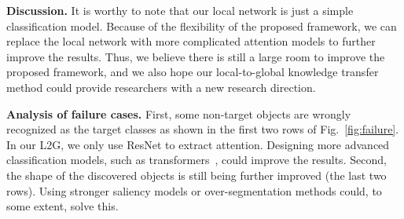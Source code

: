 \documentclass[10pt,twocolumn,letterpaper]{article}
\newcommand{\myParaP}[1]{\vspace{.05in}\noindent\textbf{#1}}
\newcommand{\figref}[1]{Fig.~\ref{#1}}
\begin{document}
\begin{table}[h]
    \centering
\small
    \renewcommand{\arraystretch}{1.10}\caption{Quantitative comparisons to previous state-of-the-art approaches
    on MS COCO validation set. 
    All the segmentation results are based on VGGNet  backbone \cite{simonyan2014very} except L2G* using ResNet-101 backbone \cite{he2016deep}.
    }\label{tab:comps_coco}
    \vspace{-5pt}
        \vspace{-10pt}
\end{table}

\myParaP{Discussion.} It is worthy to note that our local network 
is just a simple classification model.
Because of the flexibility of the proposed framework, we can replace
the local network with more complicated attention models to further
improve the results.
Thus, we believe there is still a large room to improve the proposed
framework, and we also hope our local-to-global knowledge transfer
method could provide researchers with a new research direction.


\myParaP{Analysis of failure cases.} 
First, some non-target objects are wrongly recognized as
the target classes as shown in the first two rows of \figref{fig:failure}. 
In our L2G, we only use ResNet to extract attention. 
Designing more advanced classification models, such as 
transformers~\cite{dosovitskiy2020image,yuan2021tokens}, 
could improve the results.
Second, the shape of the discovered objects is still being
further improved (the last two rows). 
Using stronger saliency models or over-segmentation methods could, 
to some extent, solve this.
\end{document}
